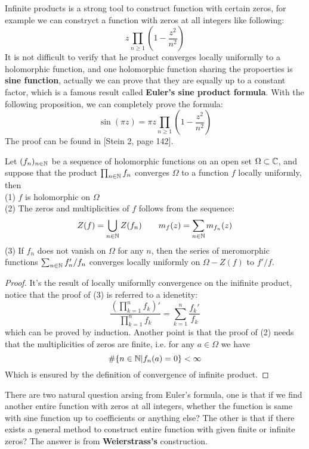 \documentclass[12pt,a4paper]{article}
\begin{document}
Infinite products is a strong tool to construct function with certain zeros, for example we can constryct a function with zeros at all integers like following:
\[z \prod_{n \geq 1} (1 - \frac{z^2}{n^2})\]
It is not difficult to verify that he product converges locally uniformlly to a holomorphic function, and one holomorphic function sharing the propoerties is \textbf{sine function}, actually we can prove that they are equally up to a constant factor, which is a famous result called \textbf{Euler's sine product formula}. With the following proposition, we can completely prove the formula:
\[\sin(\pi z) = \pi z \prod_{n \geq 1} (1 - \frac{z^2}{n^2})\]
The proof can be found in [Stein 2, page 142].
\begin{proposition}
    Let \((f_n)_{n \in \mathbb{N}}\) be a sequence of holomorphic functions on an open set \(\Omega \subset \mathbb{C}\), and suppose that the product \(\prod_{n \in \mathbb{N}} f_n\) converges  \(\Omega\) to a function \(f\) locally uniformly, then\\
    (1) \(f\) is holomorphic on \(\Omega\)\\
    (2) The zeros and multiplicities of \(f\) follows from the sequence:
    \[Z(f) = \bigcup_{n \in \mathbb{N}} Z(f_n) \qquad m_f(z)= \sum_{n \in \mathbb{N}} m_{f_n}(z)\] 
    (3) If \(f_n\) does not vanish on \(\Omega\) for any \(n\), then the series of meromorphic functions \(\sum_{n \in \mathbb{N}} f_n'/f_n\) converges locally uniformly on \(\Omega - Z(f)\) to \(f'/f\).
\end{proposition}
\begin{proof}
    It's the result of locally uniformlly convergence on the inifinite product, notice that the proof of (3) is referred to a idenetity:
    \[\frac{(\prod_{k=1}^nf_k)'}{\prod_{k=1}^nf_k} = \sum_{k=1}^n \frac{f_k'}{f_k}\]
    which can be proved by induction. Another point is that the proof of (2) needs that the multiplicities of zeros are finite, i.e. for any \(a \in \Omega\) we have
    \[\#\{n\in \mathbb{N} | f_n(a) = 0\} < \infty\]
    Which is ensured by the definition of convergence of infinite product.
\end{proof}

There are two natural question arsing from Euler's formula, one is that if we find another entire function with zeros at all integers, whether the function is same with sine function up to coefficients or anything else? The other is that if there exists a general method to construct entire function with given finite or infinite zeros? The answer is from \textbf{Weierstrass's} construction.
\end{document}
